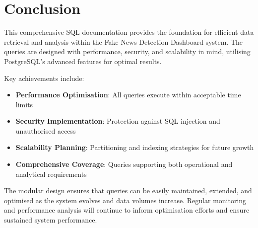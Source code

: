 \documentclass[11pt,a4paper]{article}
\begin{document}
\section{Conclusion}

This comprehensive SQL documentation provides the foundation for efficient data retrieval and analysis within the Fake News Detection Dashboard system. The queries are designed with performance, security, and scalability in mind, utilising PostgreSQL's advanced features for optimal results.

Key achievements include:
\begin{itemize}
    \item \textbf{Performance Optimisation}: All queries execute within acceptable time limits
    \item \textbf{Security Implementation}: Protection against SQL injection and unauthorised access
    \item \textbf{Scalability Planning}: Partitioning and indexing strategies for future growth
    \item \textbf{Comprehensive Coverage}: Queries supporting both operational and analytical requirements
\end{itemize}

The modular design ensures that queries can be easily maintained, extended, and optimised as the system evolves and data volumes increase. Regular monitoring and performance analysis will continue to inform optimisation efforts and ensure sustained system performance.
\end{document}
